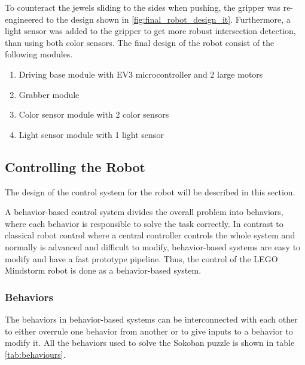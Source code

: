 \documentclass[../report.tex]{subfiles}
\begin{document}
To counteract the jewels sliding to the sides when pushing, the gripper was re-engineered to the design shown in \autoref{fig:final_robot_design_it}. Furthermore, a light sensor was added to the gripper to get more robust intersection detection, than using both color sensors. The final design of the robot consist of the following modules.
\begin{enumerate}
    \item Driving base module with EV3 microcontroller and 2 large motors
    \item Grabber module
    \item Color sensor module with 2 color sensors
    \item Light sensor module with 1 light sensor
\end{enumerate}

\subsection{Controlling the Robot} \label{subsec:controlling}
The design of the control system for the robot will be described in this section.

A behavior-based control system divides the overall problem into behaviors, where each behavior is responsible to solve the task correctly. In contrast to classical robot control where a central controller controls the whole system and normally is advanced and difficult to modify, behavior-based systems are easy to modify and have a fast prototype pipeline. Thus, the control of the LEGO Mindstorm robot is done as a behavior-based system. 

\subsubsection{Behaviors} \label{subsubsec:behaviors}
The behaviors in behavior-based systems can be interconnected with each other to either overrule one behavior from another or to give inputs to a behavior to modify it. All the behaviors used to solve the Sokoban puzzle is shown in table \ref{tab:behaviours}. 

\begin{table}[H]
\centering
{}
\caption{Berhaviours of the robot to solve the sokoban puzzle.}
\label{tab:behaviours}
\end{table}
\end{document}
